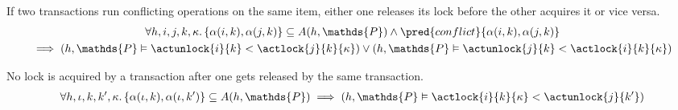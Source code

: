 \lem If two transactions run conflicting operations on the same item, either one releases its lock before the other acquires it or vice versa.
\begin{gather*}
\forall h, i, j, k, \kappa \ldotp 
\{ \alpha(i, k), \alpha(j, k) \} \subseteq A(h, \mathds{P}) \land \pred{conflict}{\alpha(i, k), \alpha(j, k)} 
\\
\implies \left( h, \mathds{P} \vDash \actunlock{i}{k} < \actlock{j}{k}{\kappa} \right) \lor \left( h, \mathds{P} \vDash \actunlock{j}{k} < \actlock{i}{k}{\kappa} \right)
\end{gather*}

\lem No lock is acquired by a transaction after one gets released by the same transaction.
\begin{gather*}
\forall h, \iota, k, k', \kappa \ldotp 
\{ \alpha(\iota, k), \alpha(\iota, k') \} \subseteq A(h, \mathds{P})
\implies \left( h, \mathds{P} \vDash \actlock{i}{k}{\kappa} < \actunlock{j}{k'} \right)
\end{gather*}